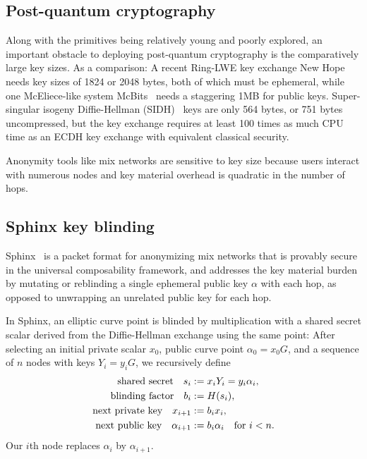 \subsection{Post-quantum cryptography}

Along with the primitives being relatively young and poorly explored,
an important obstacle to deploying post-quantum cryptography is
the comparatively large key sizes.  As a comparison: 
%
A recent Ring-LWE key exchange New Hope~\cite[\S7, p.10]{NewHope} needs
 key sizes of 1824 or 2048 bytes, both of which must be ephemeral,
while one McEliece-like system McBits~\cite{McBits,PQ-InitRec}
 needs a staggering 1MB for public keys.
%
Super-singular isogeny Diffie-Hellman (SIDH)~\cite[p. 21]{SIDH-2016} keys
are only 564 bytes, or 751 bytes uncompressed, but
 the key exchange requires at least 100 times as much CPU time as
 an ECDH key exchange with equivalent classical security.

Anonymity tools like mix networks are sensitive to key size because 
users interact with numerous nodes and key material overhead is 
quadratic in the number of hops. %


\subsection{Sphinx key blinding}


Sphinx~\cite{Sphinx} is a packet format for anonymizing mix networks
that is provably secure in the universal composability framework, and
 addresses the key material burden by mutating or reblinding a
 single ephemeral public key $\alpha$ with each hop,
 as opposed to unwrapping an unrelated public key for each hop.

In Sphinx, an elliptic curve point is blinded by multiplication with
a shared secret scalar derived from the Diffie-Hellman exchange using
the same point:
After selecting an initial private scalar $x_0$,
 public curve point $\alpha_0 = x_0 G$, and 
 a sequence of $n$ nodes with keys $Y_i = y_i G$,
we recursively define 
\[ \begin{aligned}
\textrm{shared secret}\quad
 s_i &:= x_i Y_i = y_i \alpha_i \mathcomma \\
\textrm{blinding factor}\quad
 b_i &:= H(s_i) \mathcomma \\
\textrm{next private key}\quad
 x_{i+1} &:= b_i x_i \mathcomma \\ %
\textrm{next public key}\quad
 \alpha_{i+1} &:= b_i \alpha_i \quad\textrm{for $i < n$.} \\
\end{aligned} \]
Our $i$th node replaces $\alpha_i$ by $\alpha_{i+1}$.


